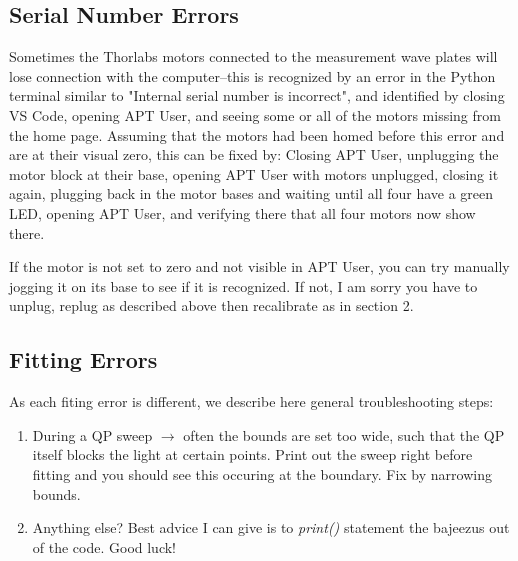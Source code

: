 \documentclass{paper}[11pt]
\begin{document}
\subsection{Serial Number Errors}
Sometimes the Thorlabs motors connected to the measurement wave plates will lose connection with the computer--this is recognized by an error in the Python terminal similar to "Internal serial number is incorrect", and identified by closing VS Code, opening APT User, and seeing some or all of the motors missing from the home page. Assuming that the motors had been homed before this error and are at their visual zero, this can be fixed by: Closing APT User, unplugging the motor block at their base, opening APT User with motors unplugged, closing it again, plugging back in the motor bases and waiting until all four have a green LED, opening APT User, and verifying there that all four motors now show there. 

If the motor is not set to zero and not visible in APT User, you can try manually jogging it on its base to see if it is recognized. If not, I am sorry you have to unplug, replug as described above then recalibrate as in section 2.
\subsection{Fitting Errors}
As each fiting error is different, we describe here general troubleshooting steps:
\begin{enumerate}
    \item During a QP sweep $\rightarrow$ often the bounds are set too wide, such that the QP itself blocks the light at certain points. Print out the sweep right before fitting and you should see this occuring at the boundary. Fix by narrowing bounds.
    \item Anything else? Best advice I can give is to \textit{print()} statement the bajeezus out of the code. Good luck!
\end{enumerate}
\end{document}
